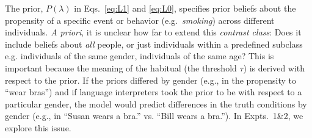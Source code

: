 \documentclass[10pt,letterpaper]{article}
\newcommand{\ndg}[1]{\textcolor{Green}{[ndg: #1]}}
\begin{document}
The prior, $P(\lambda)$ in Eqs.~\ref{eq:L1} and \ref{eq:L0}, specifies prior beliefs about the propensity of a specific event or behavior (e.g.~\emph{smoking}) across different individuals.
\emph{A priori}, it is unclear how far to extend this \emph{contrast class}: Does it include beliefs about \emph{all} people, or just individuals within a predefined subclass e.g. individuals of the same gender, individuals of the same age? 
This is important because the meaning of the habitual (the threshold $\tau$) is derived with respect to the prior. 
If the priors differed by gender (e.g., in the propensity to ``wear bras'') and if language interpreters took the prior to be with respect to a particular gender, the model would predict differences in the truth conditions by gender (e.g., in ``Susan wears a bra.'' vs. ``Bill wears a bra.''). 
In Expts.~1\&2, we explore this issue.
%
%



%
% 
\end{document}
